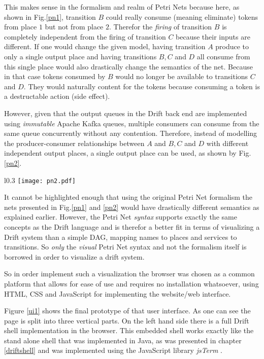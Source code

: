 This makes sense in the formalism and realm of Petri Nets because
here, as shown in Fig.\ref{pn1}, transition $B$ could really consume
(meaning eliminate) tokens from place $1$ but not from place $2$.
Therefor the \textit{firing} of transition $B$ is completely
independent from the firing of transition $C$ because their inputs
are different. If one would change the given model, having transition
$A$ produce to only a single output place and having transitions
$B, C$ and $D$ all consume from this single place would also
drastically change the semantics of the net. Because in that case
tokens consumed by $B$ would no longer be available to transitions
$C$ and $D$. They would naturally content for the tokens because
consuming a token is a destructable action (side effect).
\newline

However, given that the output queues in the Drift back end
are implemented using \textit{immutable} Apache Kafka queues, multiple
consumers can consume from the same queue concurrently without
any contention. Therefore, instead of modelling the
producer-consumer relationships between $A$ and $B, C$ and $D$
with different independent output places, a single output
place can be used, as shown by Fig.\ref{pn2}.

\begin{wrapfigure}{l}{0.3\textwidth}
  \texttt{[image: pn2.pdf]}
  \caption{Minimized net with \textit{different} semantics.}
  \label{pn2}
\end{wrapfigure}

It cannot be highlighted enough that using the original Petri Net
formalism the nets presented in Fig.\ref{pn1} and \ref{pn2} would
have drastically different semantics as explained earlier.
However, the Petri Net \textit{syntax} supports exactly the
same concepts as the Drift language and is therefor a better fit in terms
of visualizing a Drift system than a simple DAG, mapping names
to places and services to transitions. So \textit{only} the
\textit{visual} Petri Net syntax and not the
formalism itself is borrowed in order to visualize a drift system.

So in order implement such a visualization the browser was chosen
as a common platform that allows for ease of use and requires no
installation whatsoever, using HTML, CSS and JavaScript for
implementing the website/web interface.

Figure \ref{ui1} shows the final prototype of that user interface.
As one can see the page is split into three vertical parts. On the left
hand side there is a full Drift shell implementation in the
browser. This embedded shell works exactly like the stand alone
shell that was implemented in Java, as was presented in chapter
\ref{driftshell} and was implemented using the JavaScript
library \textit{jsTerm} \cite{jsTerm}.

